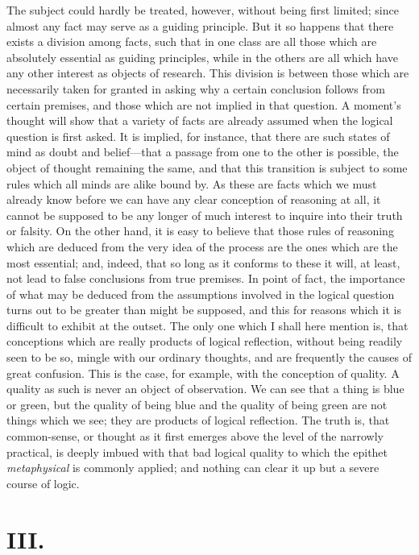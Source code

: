 The subject could hardly be treated, however, without being first
limited; since almost any fact may serve as a guiding principle. But
it so happens that there exists a division among facts, such that in
one class are all those which are absolutely essential as guiding
principles, while in the others are all which have any other interest
as objects of research. This division is between those which are
necessarily taken for granted in asking why a certain conclusion
follows from certain premises, and those which are not implied in that
question. A moment's thought will show that a variety of facts are
already assumed when the logical question is first asked. It is
implied, for instance, that there are such states of mind as doubt and
be\-lief---that a passage from one to the other is possible, the
object of thought remaining the same, and that this transition is
subject to some rules which all minds are alike bound by. As these are
facts  which we must already know before we can have any clear
conception of reasoning at all, it cannot be supposed to be any longer
of much interest to inquire into their truth or falsity. On the other
hand, it is easy to believe that those rules of reasoning which are
deduced from the very idea of the process are the ones which are the
most essential; and, indeed, that so long as it conforms to these it
will, at least, not lead to false conclusions from true premises. In
point of fact, the importance of what may be deduced from the
assumptions involved in the logical question turns out to be greater
than might be supposed, and this for reasons which it is difficult to
exhibit at the outset. The only one which I shall here mention is,
that conceptions which are really products of logical reflection,
without being readily seen to be so, mingle with our ordinary
thoughts, and are frequently the causes of great confusion. This is
the case, for example, with the conception of quality. A quality as
such is never an object of observation. We can see that a thing is
blue or green, but the quality of being blue and the quality of being
green are not things which we see; they are products of logical
reflection. The truth is, that common-sense, or thought as it first
emerges above the level of the narrowly practical, is deeply imbued
with that bad logical quality to which the epithet
\textit{metaphysical} is commonly applied; and nothing can clear it up
but a severe course of logic.

\section*{III.}

